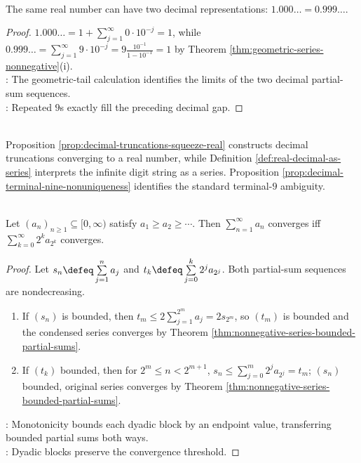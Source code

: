 \begin{proposition} \label{prop:decimal-terminal-nine-nonuniqueness} \\
The same real number can have two decimal representations: $1.000\ldots=0.999\ldots$.
\begin{proof}
$1.000\ldots=1+\sum\limits_{j=1}^{\infty}0\cdot10^{-j}=1$, while $0.999\ldots=\sum\limits_{j=1}^{\infty}9\cdot10^{-j}=9\frac{10^{-1}}{1-10^{-1}}=1$ by Theorem \ref{thm:geometric-series-nonnegative}(i).\\
: The geometric-tail calculation identifies the limits of the two decimal partial-sum sequences.\\
: Repeated $9$s exactly fill the preceding decimal gap.
\end{proof}
\end{proposition}

\begin{perspective} \label{per:decimal-expansions-as-series} \\
Proposition \ref{prop:decimal-truncations-squeeze-real} constructs decimal truncations converging to a real number, while Definition \ref{def:real-decimal-as-series} interprets the infinite digit string as a series. Proposition \ref{prop:decimal-terminal-nine-nonuniqueness} identifies the standard terminal-$9$ ambiguity.
\end{perspective}

\begin{theorem} \label{thm:cauchy-condensation-test} \\
Let $(a_n)_{n\geq1}\subseteq[0,\infty)$ satisfy $a_1\geq a_2\geq\cdots$. Then $\sum\limits_{n=1}^{\infty}a_n$ converges iff $\sum\limits_{k=0}^{\infty}2^k a_{2^k}$ converges.
\begin{proof}
Let $s_n\defeq\sum\limits_{j=1}^{n}a_j$ and $t_k\defeq\sum\limits_{j=0}^{k}2^j a_{2^j}$. Both partial-sum sequences are nondecreasing.
\begin{enumerate}[label=\roman*.]
\setlength{\itemsep}{0pt}
\item[$(\Rightarrow)$] If $(s_n)$ is bounded, then $t_m\leq2\sum\limits_{j=1}^{2^m}a_j=2s_{2^m}$, so $(t_m)$ is bounded and the condensed series converges by Theorem \ref{thm:nonnegative-series-bounded-partial-sums}.
\item[$(\Leftarrow)$] If $(t_k)$ bounded, then for $2^m\leq n<2^{m+1}$, $s_n\leq\sum\limits_{j=0}^{m}2^j a_{2^j}=t_m$; $(s_n)$ bounded, original series converges by Theorem \ref{thm:nonnegative-series-bounded-partial-sums}.
\end{enumerate}
: Monotonicity bounds each dyadic block by an endpoint value, transferring bounded partial sums both ways.\\
: Dyadic blocks preserve the convergence threshold.
\end{proof}
\end{theorem}

